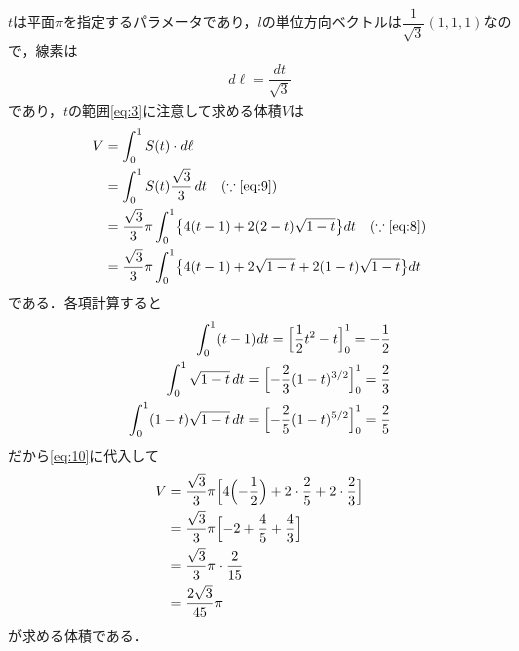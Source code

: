 \documentclass[../../main.tex]{subfiles}
\begin{document}
$t$は平面$\pi$を指定するパラメータであり，$l$の単位方向ベクトルは$\dfrac{1}{\sqrt{3}}(1,1,1)$なので，線素は
\begin{align}
  d \ell = \dfrac{dt}{\sqrt{3}} \label{eq:9}
\end{align}
であり，$t$の範囲\cref{eq:3}に注意して求める体積$V$は
\begin{align}
  V
  &=\int_0^1S(t)\cdot d\ell  \\
  &=\int_0^1S(t)\dfrac{\sqrt{3}}{3}\,dt \quad (\because\text{\cref{eq:9}})\\
  &=\dfrac{\sqrt{3}}{3}\pi\int_0^1\bigl\{4(t-1)+2(2-t)\sqrt{1-t}\bigr\}dt \quad (\because\text{\cref{eq:8}})\\
  &=\dfrac{\sqrt{3}}{3}\pi\int_0^1\bigl\{4(t-1)+2\sqrt{1-t} + 2(1-t)\sqrt{1-t}\bigr\}dt \label{eq:10}
\end{align}
である．各項計算すると
\begin{align}
  \int_0^1(t-1)dt=\Bigl[\dfrac{1}{2}t^2-t\Bigr]_0^1=-\dfrac{1}{2} \\
  \int_0^1\sqrt{1-t}\,dt=\Bigl[-\dfrac{2}{3}(1-t)^{3/2}\Bigr]_0^1=\dfrac{2}{3} \\
  \int_0^1(1-t)\sqrt{1-t}\,dt=\Bigl[-\dfrac{2}{5}(1-t)^{5/2}\Bigr]_0^1=\dfrac{2}{5}
\end{align}
だから\cref{eq:10}に代入して
\begin{align}
  V
  &=\dfrac{\sqrt{3}}{3}\pi\Bigl[4\Bigl(-\dfrac{1}{2}\Bigr)+2\cdot\dfrac{2}{5}+2\cdot\dfrac{2}{3}\Bigr] \\
  &=\dfrac{\sqrt{3}}{3}\pi\Bigl[-2+\dfrac{4}{5}+\dfrac{4}{3}\Bigr] \\
  &=\dfrac{\sqrt{3}}{3}\pi\cdot\dfrac{2}{15} \\
  &=\dfrac{2\sqrt{3}}{45}\pi
\end{align}
が求める体積である．
\end{document}
